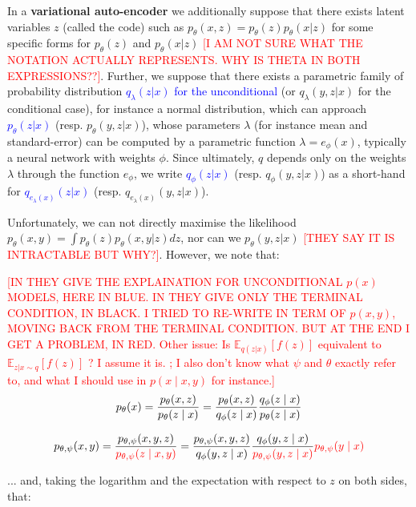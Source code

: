 \documentclass{article}
\begin{document}
\begin{appendix}
In a \textbf{variational auto-encoder} we additionally suppose that there exists latent variables $z$ (called the code) such as  $p_{\theta}(x,z)=p_\theta(z)p_\theta(x|z)$ for some specific forms for $p_\theta(z)$ and $p_\theta(x|z)$ \textcolor{red}{[I AM NOT SURE WHAT THE NOTATION ACTUALLY REPRESENTS. WHY IS THETA IN BOTH EXPRESSIONS??]}.
Further, we suppose that there exists a parametric family of probability distribution \textcolor{blue}{$q_\lambda(z|x)$ for the unconditional} (or $q_\lambda(y,z|x)$ for the conditional case), for instance a normal distribution, which can approach \textcolor{blue}{$p_\theta(z|x)$} (resp. $p_\theta(y,z|x)$), whose parameters $\lambda$ (for instance mean and standard-error) can be computed by a parametric function $\lambda=e_\phi(x)$, typically a neural network with weights $\phi$.
Since ultimately, $q$ depends only on the weights $\lambda$ through the function $e_\phi$, we write \textcolor{blue}{$q_\phi(z|x)$} (resp. $q_\phi(y,z|x)$)  as a short-hand for \textcolor{blue}{$q_{e_\lambda(x)}(z|x)$} (resp. $q_{e_\lambda(x)}(y,z|x)$).

Unfortunately, we can not directly maximise the likelihood $p_{\theta}(x,y)=\int p_\theta(z)p_\theta(x,y|z) dz$, nor can we $p_\theta(y,z|x)$ \textcolor{red}{[THEY SAY IT IS INTRACTABLE BUT WHY?]}.
However, we note that:

\textcolor{red}{[IN \cite{probml-advanced} THEY GIVE THE EXPLAINATION FOR UNCONDITIONAL $p(x)$ MODELS, HERE IN BLUE. IN \cite{zeroshot} THEY GIVE ONLY THE TERMINAL CONDITION, IN BLACK. I TRIED TO RE-WRITE IN TERM OF $p(x,y)$, MOVING BACK FROM THE TERMINAL CONDITION. BUT AT THE END I GET A PROBLEM, IN RED. Other issue: Is $\mathbb{E}_{q(z|x)}[f(z)]$ equivalent to $\mathbb{E}_{z|x\sim q}[f(z)]$ ? I assume it is. ; I also don't know what $\psi$ and $\theta$ exactly refer to, and what I should use in $p(x \mid x,y)$ for instance.]}
\textcolor{blue}{
$$
p_\theta(x) = \frac{ p_\theta(x,z) }{ p_\theta(z \mid x) } = \frac{ p_\theta(x,z) }{ q_\phi(z \mid x) }\frac{ q_\phi(z \mid x) }{ p_\theta(z \mid x) }
$$
}

$$
p_{\theta,\psi}(x, y) = \frac{ p_{\theta,\psi}(x,y,z) }{  \textcolor{red}{p_{\theta,\psi}(z \mid x, y)} } = \frac{ p_{\theta,\psi}(x,y,z) }{ q_\phi(y, z \mid x) }\frac{ q_\phi(y, z \mid x) }{  \textcolor{red}{p_{\theta,\psi}(y, z \mid x)} } \textcolor{red}{p_{\theta,\psi}(y \mid x)}
$$



... and, taking the logarithm and the expectation with respect to $z$ on both sides, that:

\begin{comment}
\end{comment}


\end{appendix}
\end{document}
